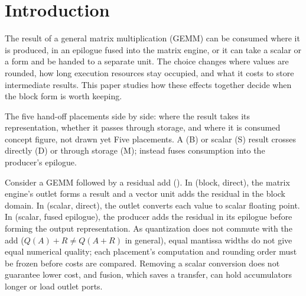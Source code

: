 
\section{Introduction}\label{sec:intro}

%
The result of a general matrix multiplication (GEMM) can be consumed where it is produced, in an epilogue fused into the matrix engine, or it can take a scalar or a \blockscaled form and be handed to a separate unit.
The choice changes where values are rounded, how long execution resources stay occupied, and what it costs to store intermediate results.
This paper studies how these effects together decide when the block form is worth keeping.

%
  {The five hand-off placements side by side: where the result takes its representation, whether it passes through storage, and where it is consumed}%
  {concept figure, not drawn yet}%
  {Five \handoff placements. A \blockscaled (B) or scalar (S) result crosses directly (D) or through storage (M); \armSE instead fuses consumption into the producer's epilogue.}

%
Consider a GEMM followed by a residual add ().
In \armBD (block, direct), the matrix engine's outlet forms a \blockscaled result and a vector unit adds the residual in the block domain.
In \armSD (scalar, direct), the outlet converts each value to scalar floating point.
In \armSE (scalar, fused epilogue), the producer adds the residual in its epilogue before forming the output representation.
As quantization does not commute with the add ($Q(A)+R \neq Q(A+R)$ in general), equal mantissa widths do not give equal numerical quality; each placement's computation and rounding order must be frozen before costs are compared.
Removing a scalar conversion does not guarantee lower cost, and fusion, which saves a transfer, can hold accumulators longer or load outlet ports.

